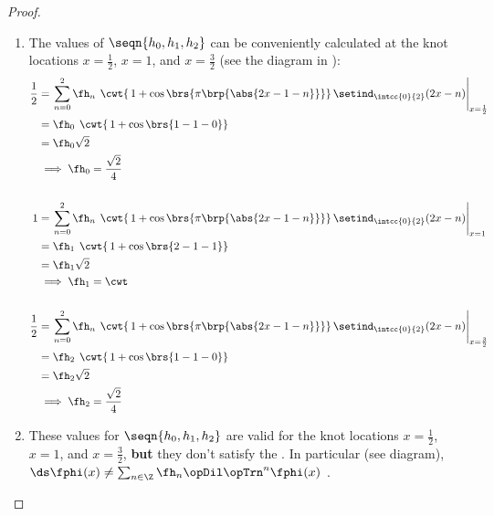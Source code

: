 \begin{proof}
\begin{enumerate}
\begin{enumerate}
      \item The values of $\seqn{h_0,h_1,h_2}$ can be conveniently calculated at the knot locations $x=\frac{1}{2}$, $x=1$, and $x=\frac{3}{2}$ (see the diagram in ):
        \begin{align*}
          \frac{1}{2}
            &= \left.\sum_{n=0}^2 \fh_n \left.\left.\cwt \right\{1 + \cos\brs{\pi\brp{\abs{2x-1-n}}}\right\}\setind_\intcc{0}{2}(2x-n)\right|_{x=\frac{1}{2}}
          \\&=\fh_0 \left.\left.\cwt \right\{1 + \cos\brs{1-1-0}\right\}
          \\&=\fh_0 \sqrt{2}
          \\&\implies\fh_0 = \frac{\sqrt{2}}{4}
          \\
          \\
          1
            &= \left.\sum_{n=0}^2 \fh_n \left.\left.\cwt \right\{1 + \cos\brs{\pi\brp{\abs{2x-1-n}}}\right\}\setind_\intcc{0}{2}(2x-n)\right|_{x=1}
          \\&=\fh_1 \left.\left.\cwt \right\{1 + \cos\brs{2-1-1}\right\}
          \\&=\fh_1 \sqrt{2}
          \\&\implies\fh_1 = \cwt
          \\
          \\
          \frac{1}{2}
            &= \left.\sum_{n=0}^2 \fh_n \left.\left.\cwt \right\{1 + \cos\brs{\pi\brp{\abs{2x-1-n}}}\right\}\setind_\intcc{0}{2}(2x-n)\right|_{x=\frac{3}{2}}
          \\&=\fh_2 \left.\left.\cwt \right\{1 + \cos\brs{1-1-0}\right\}
          \\&=\fh_2 \sqrt{2}
          \\&\implies\fh_2 = \frac{\sqrt{2}}{4}
        \end{align*}

      \item These values for $\seqn{h_0,h_1,h_2}$ are valid for the knot locations $x=\frac{1}{2}$, $x=1$, and $x=\frac{3}{2}$,
            \textbf{but} they don't satisfy the  . In particular (see diagram),
            \\\indentx$\ds\fphi(x) \neq \sum_{n\in\Z}\fh_n \opDil\opTrn^n \fphi(x)$ .
    \end{enumerate}
\end{enumerate}
\end{proof}

